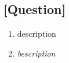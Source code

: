 \documentclass{article}
\newcommand{\bld}{\textbf}
\newcommand{\itl}{\textit}
\newcommand{\bitem}[1]{\item[\bld{#1}]}
\newcommand{\iitem}[1]{\item[\itl{#1}]}
\begin{document}
\subsection*{[Question]}
\begin{enumerate}
  \bitem{n} description
  \iitem{n} \itl{bescription}
\end{enumerate}
\end{document}
